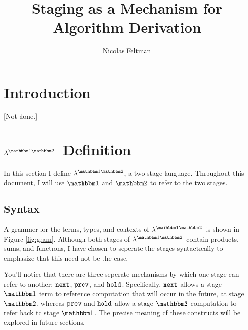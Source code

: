 \documentclass[11pt]{article}
\title{\Large\textbf{Staging as a Mechanism for Algorithm Derivation}}
\author{Nicolas Feltman}
\newcommand {\bbone} {\mathbbm 1}
\newcommand {\bbtwo} {\mathbbm 2}
\newcommand {\lang} {$\lambda^{\bbone\bbtwo}$}
\newcommand {\pause} {{\tt hold}}
\newcommand {\next} {{\tt next}}
\newcommand {\prev} {{\tt prev}}
\begin{document}
\maketitle

\section{Introduction}

[Not done.]

\section{\lang~Definition}
\label{sec:def}

In this section I define \lang, a two-stage language.  Throughout this document, I will use $\bbone$ and $\bbtwo$ to refer to the two stages.  

\subsection{Syntax}

A grammer for the terms, types, and contexts of \lang\ is shown in Figure \ref{fig:gram}.  Although both stages of \lang\ contain products, sums, and functions, I have chosen to seperate the stages syntactically to emphasize that this need not be the case.

You'll notice that there are three seperate mechanisms by which one stage can refer to another: $\next$, $\prev$, and $\pause$.  Specifically, $\next$ allows a stage $\bbone$ term to reference computation that will occur in the future, at stage $\bbtwo$, whereas $\prev$ and $\pause$ allow a stage $\bbtwo$ computation to refer back to stage $\bbone$.  The precise meaning of these constructs will be explored in future sections.
\end{document}
